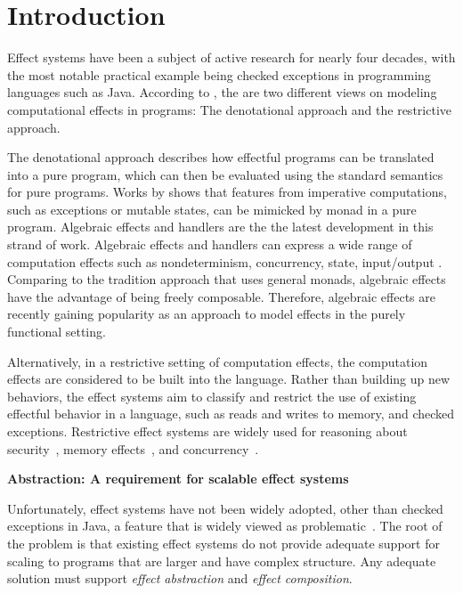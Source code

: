 
\chapter{Introduction}


Effect systems have been a subject of active research for nearly four decades, with the most notable practical example being checked exceptions in programming languages such as Java. According to \citet{filinski10}, the are two different views on modeling computational effects in programs: The denotational approach and the restrictive approach.

The denotational approach describes how effectful programs can be translated into a pure program, which can then be evaluated using the standard semantics for pure programs. Works by \citet{moggi89} shows that features from imperative computations, such as exceptions or mutable states, can be mimicked by monad in a pure program. Algebraic effects and handlers \cite{plotkin09} are the the latest development in this strand of work. Algebraic effects and handlers can express a wide range of computation effects such as nondeterminism, concurrency, state, input/output \cite{plotkin09}. Comparing to the tradition approach that uses general monads, algebraic effects have the advantage of being freely composable. Therefore, algebraic effects are recently gaining popularity as an approach to model effects in the purely functional setting.

Alternatively, in a restrictive setting of computation effects, the computation effects are considered to be built into the language. Rather than building up new behaviors, the effect systems aim to classify and restrict the use of existing effectful behavior in a language, such as reads and writes to memory, and checked exceptions. Restrictive effect systems are widely used for reasoning about security~\cite{turbak08}, memory effects~\cite{lucassen88}, and concurrency~\cite{bocchino09,bracevac18,dolan17}. 

\noindent\textbf{Abstraction: A requirement for scalable effect systems}

 Unfortunately, effect systems have not been widely adopted, other than checked exceptions in Java, a feature that is widely viewed as problematic~\cite{10.1145/1103845.1094847}.  The root of the problem is that existing effect systems do not provide adequate support for scaling to programs that are larger and have complex structure.  Any adequate solution must support \textit{effect abstraction} and \textit{effect composition}.


